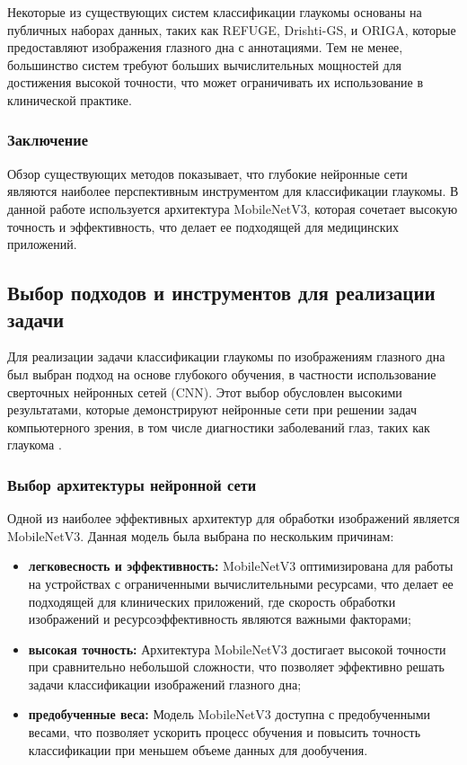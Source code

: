 {    Некоторые из существующих систем классификации глаукомы основаны на публичных наборах данных, таких как REFUGE, Drishti-GS, и ORIGA, которые предоставляют изображения глазного дна с аннотациями. Тем не менее, большинство систем требуют больших вычислительных мощностей для достижения высокой точности, что может ограничивать их использование в клинической практике.

    \subsubsection*{Заключение}

    Обзор существующих методов показывает, что глубокие нейронные сети являются наиболее перспективным инструментом для классификации глаукомы. В данной работе используется архитектура MobileNetV3, которая сочетает высокую точность и эффективность, что делает ее подходящей для медицинских приложений.
\newpage

    \subsection{Выбор подходов и инструментов для реализации задачи}

    Для реализации задачи классификации глаукомы по изображениям глазного дна был выбран подход на основе глубокого обучения, в частности использование сверточных нейронных сетей (CNN). Этот выбор обусловлен высокими результатами, которые демонстрируют нейронные сети при решении задач компьютерного зрения, в том числе диагностики заболеваний глаз, таких как глаукома \cite{CNN}.

    \subsubsection*{Выбор архитектуры нейронной сети}

    Одной из наиболее эффективных архитектур для обработки изображений является MobileNetV3. Данная модель была выбрана по нескольким причинам:
    \begin{itemize}
        \item \textbf{легковесность и эффективность:} MobileNetV3 оптимизирована для работы на устройствах с ограниченными вычислительными ресурсами, что делает ее подходящей для клинических приложений, где скорость обработки изображений и ресурсоэффективность являются важными факторами;
        \item \textbf{высокая точность:} Архитектура MobileNetV3 достигает высокой точности при сравнительно небольшой сложности, что позволяет эффективно решать задачи классификации изображений глазного дна;
        \item \textbf{предобученные веса:} Модель MobileNetV3 доступна с предобученными весами, что позволяет ускорить процесс обучения и повысить точность классификации при меньшем объеме данных для дообучения.
    \end{itemize}

}

